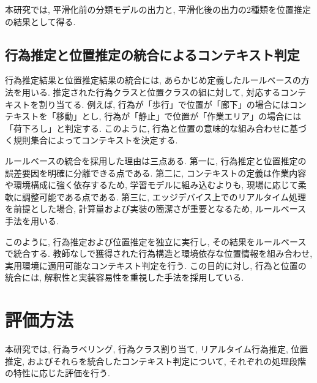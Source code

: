\documentclass[a4paper,12pt]{jreport}
\begin{document}
本研究では, 平滑化前の分類モデルの出力と, 平滑化後の出力の2種類を位置推定の結果として得る. 

\subsection{行為推定と位置推定の統合によるコンテキスト判定}
行為推定結果と位置推定結果の統合には, あらかじめ定義したルールベースの方法を用いる. 推定された行為クラスと位置クラスの組に対して, 対応するコンテキストを割り当てる. 例えば, 行為が「歩行」で位置が「廊下」の場合にはコンテキストを「移動」とし, 行為が「静止」で位置が「作業エリア」の場合には「荷下ろし」と判定する. このように, 行為と位置の意味的な組み合わせに基づく規則集合によってコンテキストを決定する. 

ルールベースの統合を採用した理由は三点ある. 第一に, 行為推定と位置推定の誤差要因を明確に分離できる点である. 第二に, コンテキストの定義は作業内容や環境構成に強く依存するため, 学習モデルに組み込むよりも, 現場に応じて柔軟に調整可能である点である. 第三に, エッジデバイス上でのリアルタイム処理を前提とした場合, 計算量および実装の簡潔さが重要となるため, ルールベース手法を用いる. 

このように, 行為推定および位置推定を独立に実行し, その結果をルールベースで統合する. 教師なしで獲得された行為構造と環境依存な位置情報を組み合わせ, 実用環境に適用可能なコンテキスト判定を行う. この目的に対し, 行為と位置の統合には, 解釈性と実装容易性を重視した手法を採用している. 



\section{評価方法}
本研究では, 行為ラベリング, 行為クラス割り当て, リアルタイム行為推定, 位置推定, およびそれらを統合したコンテキスト判定について, それぞれの処理段階の特性に応じた評価を行う. 
\end{document}
